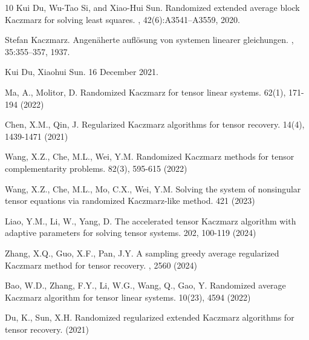 \documentclass[11pt]{article}
\begin{document}
{\begin{thebibliography}{10}
Kui Du, Wu-Tao Si, and Xiao-Hui Sun.
\newblock Randomized extended average block {K}aczmarz for solving least
  squares.
, 42(6):A3541--A3559, 2020.


Stefan Kaczmarz.
\newblock Angen\"aherte aufl\"osung von systemen linearer gleichungen.
, 35:355--357, 1937.

Kui Du, Xiaohui Sun.
 16 December 2021.

Ma, A., Molitor, D.
\newblock Randomized Kaczmarz for tensor linear systems. 
 62(1), 171-194 (2022)

Chen, X.M., Qin, J.
\newblock Regularized Kaczmarz algorithms for tensor recovery.
 14(4), 1439-1471 (2021)

Wang, X.Z., Che, M.L., Wei, Y.M.
\newblock Randomized Kaczmarz methods for tensor complementarity problems.  82(3), 595-615 (2022)

Wang, X.Z., Che, M.L., Mo, C.X., Wei, Y.M.
Solving the system of nonsingular tensor equations via
randomized Kaczmarz-like method. 
 421 (2023)

Liao, Y.M., Li, W., Yang, D.
\newblock The accelerated tensor Kaczmarz algorithm with adaptive parameters for solving tensor systems. 
 202, 100-119 (2024)

Zhang, X.Q., Guo, X.F., Pan, J.Y.
\newblock A sampling greedy average regularized Kaczmarz method for tensor
recovery. 
, 2560 (2024)

Bao, W.D., Zhang, F.Y., Li, W.G., Wang, Q., Gao, Y.
\newblock Randomized average Kaczmarz algorithm for
tensor linear systems. 
 10(23), 4594 (2022)

Du, K., Sun, X.H.
\newblock Randomized regularized extended Kaczmarz algorithms for tensor recovery. 
(2021)


\end{thebibliography}}
\end{document}
